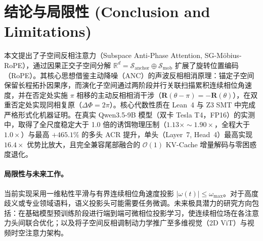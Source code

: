 \documentclass[11pt,a4paper]{article}
\theoremstyle{definition}
\begin{document}
\section{结论与局限性 (Conclusion and Limitations)}
本文提出了子空间反相注意力（Subspace Anti-Phase Attention, SG-M\"obius-RoPE），通过因果正交子空间分解 $\mathbb{R}^d = \mathcal{S}_{\text{anchor}} \oplus \mathcal{S}_{\text{mob}}$ 扩展了旋转位置编码（RoPE）。其核心思想借鉴主动降噪（ANC）的声波反相相消原理：锚定子空间保留长程拓扑因果序，而演化子空间通过两阶段并行关联扫描累积连续相位角速度，并在否定处实施 $\pi$ 相移的主动反相相消干涉（$\mathbf{R}(\theta - \pi) = -\mathbf{R}(\theta)$），在双重否定处实现同相复原（$\Delta\Phi = 2\pi$）。核心代数性质在 Lean~4 与 Z3 SMT 中完成严格形式化机器证明。在真实 Qwen3.5-9B 模型（双卡 Tesla T4，FP16）的实测中，取得了全尺度稳定大于 1.0 倍的诱饵物理压制（$1.13\times\sim 1.90\times$，全程大于 $1.0\times$）与最高 $+465.1\%$ 的多头 ACR 提升，单头（Layer~7, Head~4）最高实现 $16.4\times$ 优势比放大，且完全兼容尾部融合的 $\mathcal{O}(1)$ KV-Cache 增量解码与零困惑度退化。

\paragraph{局限性与未来工作。}
当前实现采用一维粘性平滑与有界连续相位角速度投影 $|\omega(t)| \le \omega_{\max}$。对于高度歧义或专业领域语料，语义投影头可能需要任务微调。未来极具潜力的研究方向包括：在基础模型预训练阶段进行端到端可微相位投影学习，使连续相位场在各注意力头间联合优化；以及将子空间反相调制动力学推广至多维视觉（2D ViT）与视频时空注意力架构。



\end{document}

